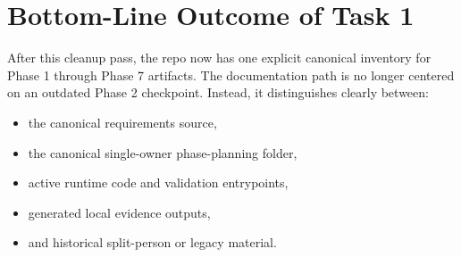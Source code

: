 \documentclass{article}
\begin{document}
\section*{Bottom-Line Outcome of Task 1}
After this cleanup pass, the repo now has one explicit canonical inventory for Phase 1 through Phase 7 artifacts. The documentation path is no longer centered on an outdated Phase 2 checkpoint. Instead, it distinguishes clearly between:
\begin{itemize}
\item the canonical requirements source,
\item the canonical single-owner phase-planning folder,
\item active runtime code and validation entrypoints,
\item generated local evidence outputs,
\item and historical split-person or legacy material.
\end{itemize}
\end{document}
